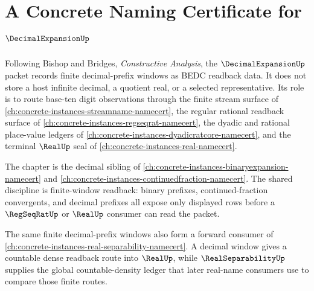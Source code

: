 \chapter{A Concrete Naming Certificate for $\DecimalExpansionUp$}
\label{ch:concrete-instances-decimalexpansion-namecert}

Following Bishop and Bridges, \emph{Constructive Analysis}, the
$\DecimalExpansionUp$ packet records finite decimal-prefix windows as BEDC
readback data. It does not store a host infinite decimal, a quotient real, or
a selected representative. Its role is to route base-ten digit observations
through the finite stream surface of
\autoref{ch:concrete-instances-streamname-namecert}, the regular rational
readback surface of \autoref{ch:concrete-instances-regseqrat-namecert}, the
dyadic and rational place-value ledgers of
\autoref{ch:concrete-instances-dyadicratcore-namecert}, and the terminal
$\RealUp$ seal of \autoref{ch:concrete-instances-real-namecert}.

The chapter is the decimal sibling of
\autoref{ch:concrete-instances-binaryexpansion-namecert} and
\autoref{ch:concrete-instances-continuedfraction-namecert}. The shared
discipline is finite-window readback: binary prefixes, continued-fraction
convergents, and decimal prefixes all expose only displayed rows before a
$\RegSeqRatUp$ or $\RealUp$ consumer can read the packet.

The same finite decimal-prefix windows also form a forward consumer of
\autoref{ch:concrete-instances-real-separability-namecert}. A decimal window
gives a countable dense readback route into $\RealUp$, while
$\RealSeparabilityUp$ supplies the global countable-density ledger that later
real-name consumers use to compare those finite routes.

